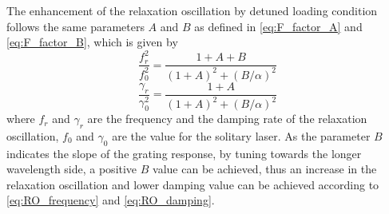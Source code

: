 The enhancement of the relaxation oscillation by detuned loading condition follows the same parameters $A$ and $B$ as defined in \autoref{eq:F_factor_A} and \autoref{eq:F_factor_B}, which is given by \cite{agrawal1988modulation}
\begin{equation}
    \frac{f_r^2}{f_{0}^2}=\frac{1+A+B}{(1+A)^2+(B/\alpha)^2}
    \label{eq:RO_frequency}
\end{equation}
\begin{equation}
    \frac{\gamma_r}{\gamma_{0}^2}=\frac{1+A}{(1+A)^2+(B/\alpha)^2}
    \label{eq:RO_damping}
\end{equation}
where $f_r$ and $\gamma_r$ are the frequency and the damping rate of the relaxation oscillation, $f_{0}$ and $\gamma_0$ are the value for the solitary laser. As the parameter $B$ indicates the slope of the grating response, by tuning towards the longer wavelength side, a positive $B$ value can be achieved, thus an increase in the relaxation oscillation and lower damping value can be achieved according to \autoref{eq:RO_frequency} and \autoref{eq:RO_damping}.






